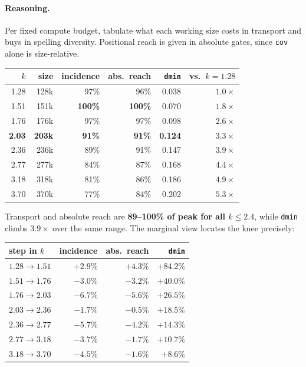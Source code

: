 \documentclass[11pt]{article}
\begin{document}
\paragraph{Reasoning.} Per fixed compute budget, tabulate what each working size
costs in transport and buys in spelling diversity. Positional reach is given in
absolute gates, since \texttt{cov} alone is size-relative.

\begin{center}
\begin{tabular}{rrrrrr}
\toprule
$k$ & size & incidence & abs.\ reach & \texttt{dmin} & vs.\ $k{=}1.28$ \\
\midrule
1.28 & 128k &  97\% &  96\% & 0.038 & $1.0\times$ \\
1.51 & 151k & \textbf{100\%} & \textbf{100\%} & 0.070 & $1.8\times$ \\
1.76 & 176k &  97\% &  97\% & 0.098 & $2.6\times$ \\
\textbf{2.03} & \textbf{203k} & \textbf{91\%} & \textbf{91\%} & \textbf{0.124} & $\mathbf{3.3\times}$ \\
2.36 & 236k &  89\% &  91\% & 0.147 & $3.9\times$ \\
2.77 & 277k &  84\% &  87\% & 0.168 & $4.4\times$ \\
3.18 & 318k &  81\% &  86\% & 0.186 & $4.9\times$ \\
3.70 & 370k &  77\% &  84\% & 0.202 & $5.3\times$ \\
\bottomrule
\end{tabular}
\end{center}

Transport and absolute reach are \textbf{89--100\% of peak for all $k \le 2.4$},
while \texttt{dmin} climbs $3.9\times$ over the same range. The marginal view
locates the knee precisely:

\begin{center}
\begin{tabular}{lrrr}
\toprule
step in $k$ & incidence & abs.\ reach & \texttt{dmin} \\
\midrule
$1.28 \to 1.51$ & $+2.9\%$ & $+4.3\%$ & $+84.2\%$ \\
$1.51 \to 1.76$ & $-3.0\%$ & $-3.2\%$ & $+40.0\%$ \\
$1.76 \to 2.03$ & $-6.7\%$ & $-5.6\%$ & $+26.5\%$ \\
$2.03 \to 2.36$ & $-1.7\%$ & $-0.5\%$ & $+18.5\%$ \\
\midrule
$2.36 \to 2.77$ & $-5.7\%$ & $-4.2\%$ & $+14.3\%$ \\
$2.77 \to 3.18$ & $-3.7\%$ & $-1.7\%$ & $+10.7\%$ \\
$3.18 \to 3.70$ & $-4.5\%$ & $-1.6\%$ & $+8.6\%$ \\
\bottomrule
\end{tabular}
\end{center}
\end{document}
